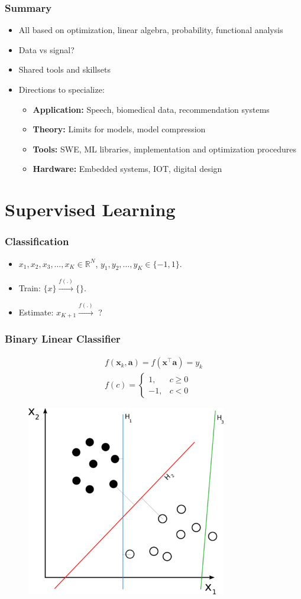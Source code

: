\documentclass[a4,xcolor=dvipsnames]{beamer}
\def\R{\mathbb{R}}
\def\a{\mathbf{a}}
\def\x{\mathbf{x}}
\begin{document}
\begin{frame}
    \frametitle{Summary}
    \begin{itemize}
        \item All based on optimization, linear algebra, probability, functional analysis
        \item Data vs signal?
        \item Shared tools and skillsets
        \item Directions to specialize:
        \begin{itemize}
            \item \textbf{Application:} Speech, biomedical data, recommendation systems
            \item \textbf{Theory:} Limits for models, model compression
            \item \textbf{Tools:} SWE, ML libraries, implementation and optimization procedures
            \item \textbf{Hardware:} Embedded systems, IOT, digital design
        \end{itemize}
    \end{itemize}
\end{frame}


\section{Supervised Learning}
\begin{frame}
    \frametitle{Classification}

    \begin{itemize}
        \item $x_1, x_2, x_3, \dots, x_K \in\R^{N}$, $y_1, y_2,\dots, y_K\in\{-1,1\}$.
        \item Train: $\{x\} \xrightarrow{f(.)} \{\}$.
        \item Estimate: $x_{K+1} \xrightarrow{f(.)}$ ?
    \end{itemize}
\end{frame}

\begin{frame}
    \frametitle{Binary Linear Classifier}
    \begin{gather}
        f(\x_k , \a) = f\left(\x^\top \a \right) = y_k \\
        f(c) = \begin{cases}
                1, & c\geq 0\\
                -1, & c<0
                \end{cases}
    \end{gather}
    \begin{figure}[H]
        \centering
        \includegraphics[width=.3\textwidth]{separating_hyperplanes.png}
    \end{figure}
\end{frame}
\end{document}
